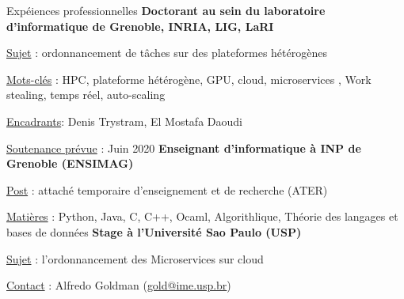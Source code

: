 
\begin{rubric}{Expéiences professionnelles}
%
%
%
\entry*[]
    \textbf{Doctorant au sein du laboratoire d'informatique de Grenoble, INRIA, LIG, LaRI}
    \hfill {} 
    \par \underline{Sujet} : ordonnancement de tâches sur des plateformes hétérogènes
    \hfill {}
    \par \underline{Mots-clés} : HPC, plateforme hétérogène, GPU, cloud, microservices , Work stealing, temps réel, auto-scaling
        \hfill {}
    \par \underline{Encadrants}: Denis Trystram, El Mostafa Daoudi
    \par \underline{Soutenance prévue} : Juin 2020
%
%
\entry*[]
    \textbf{Enseignant d'informatique à INP de Grenoble (ENSIMAG)} 
     \hfill {} 
    \par \underline{Post} : attaché temporaire d'enseignement et de recherche (ATER)
        \hfill {}
    \par \underline{Matières} : Python, Java, C, C++, Ocaml, Algorithlique, Théorie des langages et bases de données%
        \hfill {}
\entry*[]
    \textbf{Stage à l'Université Sao Paulo (USP)} %
     \hfill{} 
    \par \underline{Sujet} : l'ordonnancement des Microservices sur cloud
    \hfill {}
    \par \underline{Contact} : Alfredo Goldman (\href{mailto:gold@ime.usp.br}{gold@ime.usp.br})

\end{rubric}
